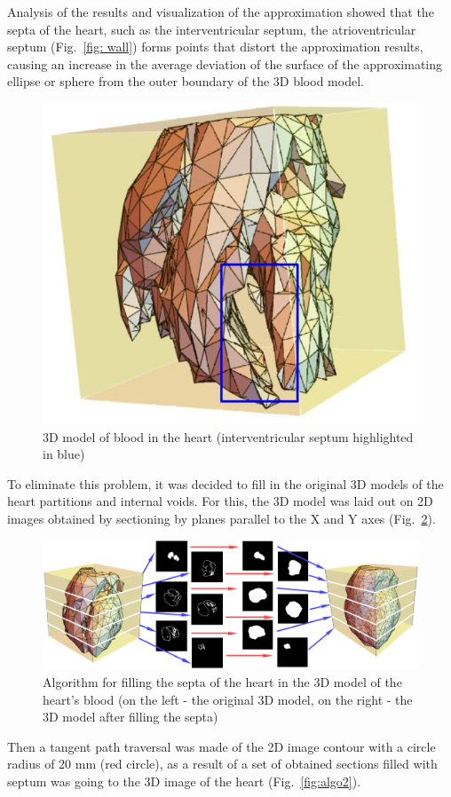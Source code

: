 \documentclass[conference]{IEEEtran}
\begin{document}
Analysis of the results and visualization of the approximation showed that the
septa of the heart, such as the interventricular septum, 
the atrioventricular septum (Fig.~\ref{fig: wall}) forms points that distort
the approximation results, causing an increase in the average deviation of the
surface of the approximating ellipse or sphere from the outer boundary of the 3D
blood model. 
\begin{figure}[tbph]
    \centering
    \includegraphics[width=0.8\linewidth]{fig/wall}
    \caption{3D model of blood in the heart (interventricular septum highlighted in blue)}
    \label{fig:wall}
\end{figure}
To eliminate this problem, it was decided to fill in the original 3D models of
the heart partitions and internal voids. For this, the 3D model was laid out on
2D images obtained by sectioning by planes parallel to the X and Y axes (Fig.~\ref{fig:algo}). 
\begin{figure}[tbph]
    \centering
    \includegraphics[width=\linewidth]{fig/algo}
    \caption{Algorithm for filling the septa of the heart in the 3D model of the heart's blood 
    (on the left - the original 3D model, on the right - the 3D model after filling the septa)}
    \label{fig:algo}
\end{figure}
Then a tangent path traversal was made of the 2D image contour with a circle radius of
20 mm (red circle), as a result of a set of obtained sections filled with septum
was going to the 3D image of the heart (Fig.~\ref{fig:algo2}).
\end{document}
